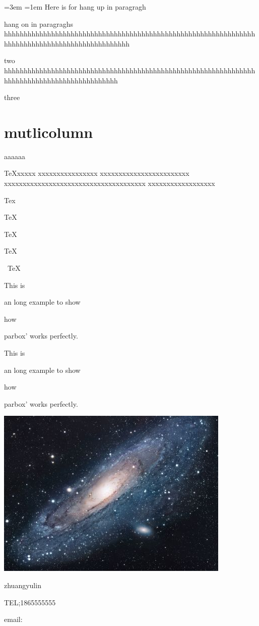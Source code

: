 \documentclass{article}
\begin{document}

{
\leftskip=3em
\parindent=1em
Here is for hang up in paragragh

hang on in paragraghs hhhhhhhhhhhhhhhhhhhhhhhhhhhhhhhhhhhhhhhhhhhhhhhhhhhhhhhhhhhhhhhhhhhhhhhhhhhhhhhhhhhhhhhhhhhhhhhh

two hhhhhhhhhhhhhhhhhhhhhhhhhhhhhhhhhhhhhhhhhhhhhhhhhhhhhhhhhhhhhhhhhhhhhhhhhhhhhhhhhhhhhhhhhhhhh

three

}

\section{mutlicolumn}

	aaa\hspace{.25\textwidth}aaa
	
	\parbox[t]{5em}{TeXxxxxx xxxxxxxxxxxxxxxx xxxxxxxxxxxxxxxxxxxxxxxx           xxxxxxxxxxxxxxxxxxxxxxxxxxxxxxxxxxxxxx xxxxxxxxxxxxxxxxxx\par Tex}
	\hfill
	\parbox[t]{0.2\linewidth}{TeX\smallskip\par TeX}
	\hfill
	\parbox[t]{0.2\linewidth}{TeX\bigskip\par\ TeX}


This is \parbox[t]{4em}{an long
example to show} how \parbox[b]
{5em}{parbox' works perfectly.}

This is 
\begin{minipage}[t]{4em}
an long
example to show
\end{minipage}
how 
\parbox[b]
{5em}{parbox' works perfectly.}

\parbox[t]{0.25\linewidth}{\includegraphics[scale=1.7]{universe.jpg}}
\hfill
\parbox[t]{0.25\linewidth}{zhuangyulin\par TEL;1865555555\par email:}
\end{document}
